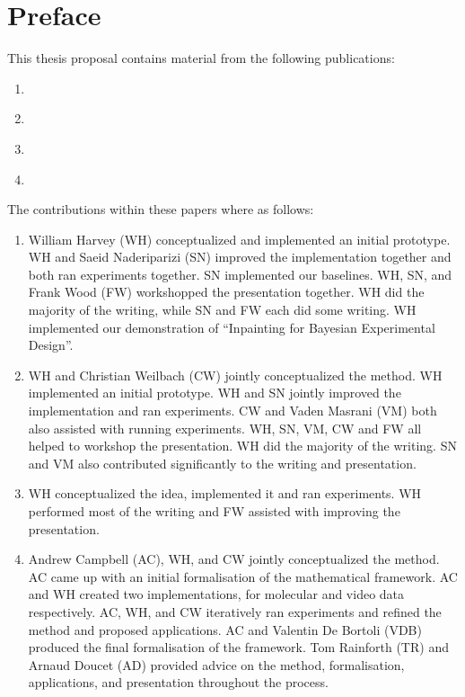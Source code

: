 
\chapter{Preface}

This thesis proposal contains material from the following publications:
\begin{enumerate}
    \item \citet{harvey2021conditional}
    \item \citet{harvey2022flexible}
    \item \citet{harvey2023visual}
    \item \citet{campbell2024trans}
\end{enumerate}

The contributions within these papers where as follows:
\begin{enumerate}
    \item William Harvey (WH) conceptualized and implemented an initial prototype. WH and Saeid Naderiparizi (SN) improved the implementation together and both ran experiments together.  SN implemented our baselines. WH, SN, and Frank Wood (FW) workshopped the presentation together. WH did the majority of the writing, while SN and FW each did some writing. WH implemented our demonstration of ``Inpainting for Bayesian Experimental Design''.
    \item WH and Christian Weilbach (CW) jointly conceptualized the method. WH implemented an initial prototype. WH and SN jointly improved the implementation and ran experiments. CW and Vaden Masrani (VM) both also assisted with running experiments. WH, SN, VM, CW and FW all helped to workshop the presentation. WH did the majority of the writing. SN and VM also contributed significantly to the writing and presentation.
    \item WH conceptualized the idea, implemented it and ran experiments. WH performed most of the writing and FW assisted with improving the presentation.
    \item Andrew Campbell (AC), WH, and CW jointly conceptualized the method. AC came up with an initial formalisation of the mathematical framework. AC and WH created two implementations, for molecular and video data respectively. AC, WH, and CW iteratively ran experiments and refined the method and proposed applications. AC and Valentin De Bortoli (VDB) produced the final formalisation of the framework. Tom Rainforth (TR) and Arnaud Doucet (AD) provided advice on the method, formalisation, applications, and presentation throughout the process.
\end{enumerate}